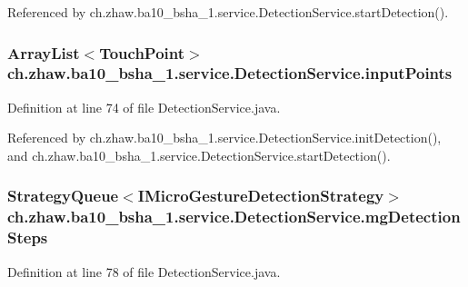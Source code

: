 Referenced by ch.zhaw.ba10\_\-bsha\_\-1.service.DetectionService.startDetection().\hypertarget{classch_1_1zhaw_1_1ba10__bsha__1_1_1service_1_1DetectionService_a6bf9d1f281b4bc5efb555b742f2ad928}{
\subsubsection[{inputPoints}]{\setlength{\rightskip}{0pt plus 5cm}ArrayList$<${\bf TouchPoint}$>$ {\bf ch.zhaw.ba10\_\-bsha\_\-1.service.DetectionService.inputPoints}}}
\label{classch_1_1zhaw_1_1ba10__bsha__1_1_1service_1_1DetectionService_a6bf9d1f281b4bc5efb555b742f2ad928}


Definition at line 74 of file DetectionService.java.

Referenced by ch.zhaw.ba10\_\-bsha\_\-1.service.DetectionService.initDetection(), and ch.zhaw.ba10\_\-bsha\_\-1.service.DetectionService.startDetection().\hypertarget{classch_1_1zhaw_1_1ba10__bsha__1_1_1service_1_1DetectionService_ace6fc1c597f8789a6f7f8048296799a3}{
\subsubsection[{mgDetectionSteps}]{\setlength{\rightskip}{0pt plus 5cm}StrategyQueue$<${\bf IMicroGestureDetectionStrategy}$>$ {\bf ch.zhaw.ba10\_\-bsha\_\-1.service.DetectionService.mgDetectionSteps}}}
\label{classch_1_1zhaw_1_1ba10__bsha__1_1_1service_1_1DetectionService_ace6fc1c597f8789a6f7f8048296799a3}


Definition at line 78 of file DetectionService.java.

